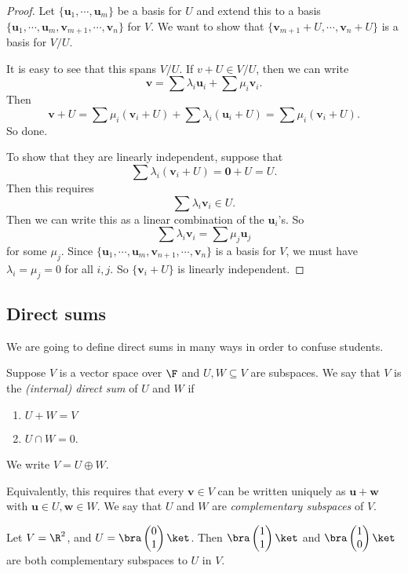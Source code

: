 \documentclass[a4paper]{article}
\begin{document}
\begin{proof}
  Let $\{\mathbf{u}_1, \cdots, \mathbf{u}_m\}$ be a basis for $U$ and extend this to a basis $\{\mathbf{u}_1, \cdots, \mathbf{u}_m,\allowbreak \mathbf{v}_{m + 1}, \cdots, \mathbf{v}_n\}$ for $V$. We want to show that $\{\mathbf{v}_{m + 1} + U, \cdots, \mathbf{v}_n + U\}$ is a basis for $V/U$.

  It is easy to see that this spans $V/U$. If $v + U \in V/U$, then we can write
  \[
    \mathbf{v} = \sum \lambda_i \mathbf{u}_i + \sum \mu_i \mathbf{v}_i.
  \]
  Then
  \[
    \mathbf{v} + U = \sum \mu_i (\mathbf{v}_i + U) + \sum \lambda_i (\mathbf{u}_i + U) =  \sum \mu_i (\mathbf{v}_i + U).
  \]
  So done.

  To show that they are linearly independent, suppose that
  \[
    \sum \lambda_i (\mathbf{v}_i + U) = \mathbf{0} + U = U.
  \]
  Then this requires
  \[
    \sum \lambda_i \mathbf{v}_i \in U.
  \]
  Then we can write this as a linear combination of the $\mathbf{u}_i$'s. So
  \[
    \sum \lambda_i \mathbf{v}_i = \sum \mu_j \mathbf{u}_j
  \]
  for some $\mu_j$. Since $\{\mathbf{u}_1, \cdots, \mathbf{u}_m, \mathbf{v}_{n + 1}, \cdots, \mathbf{v}_n\}$ is a basis for $V$, we must have $\lambda_i = \mu_j = 0$ for all $i, j$. So $\{\mathbf{v}_i + U\}$ is linearly independent.
\end{proof}
\subsection{Direct sums}
We are going to define direct sums in many ways in order to confuse students.
\begin{defi}
  Suppose $V$ is a vector space over $\F$ and $U, W\subseteq V$ are subspaces. We say that $V$ is the \emph{(internal) direct sum} of $U$ and $W$ if
  \begin{enumerate}
    \item $U + W = V$
    \item $U \cap W = 0$.
  \end{enumerate}
  We write $V = U\oplus W$.

  Equivalently, this requires that every $\mathbf{v}\in V$ can be written uniquely as $\mathbf{u} + \mathbf{w}$ with $\mathbf{u}\in U, \mathbf{w}\in W$. We say that $U$ and $W$ are \emph{complementary subspaces} of $V$.
\end{defi}

\begin{eg}
  Let $V = \R^2$, and $U = \bra \begin{pmatrix}0\\1\end{pmatrix}\ket$. Then $\bra \begin{pmatrix}1\\1\end{pmatrix}\ket$ and $\bra \begin{pmatrix}1\\0\end{pmatrix}\ket$ are both complementary subspaces to $U$ in $V$.
\end{eg}
\end{document}
